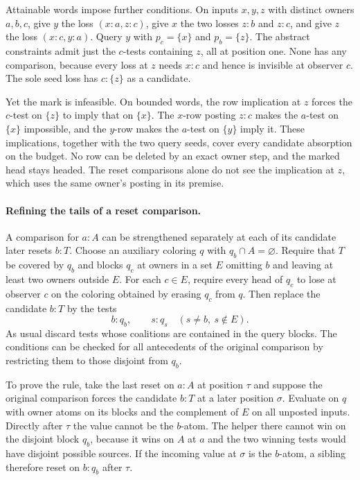 Attainable words impose further conditions.
On inputs $x,y,z$ with distinct owners $a,b,c$,
give $y$ the loss $(x{:}a,z{:}c)$, give $x$ the
two losses $z{:}b$ and $z{:}c$, and give $z$ the
loss $(x{:}c,y{:}a)$. Query $y$ with
$p_c=\{x\}$ and $p_b=\{z\}$. The abstract
constraints admit just the $c$-tests containing
$z$, all at position one. None has any
comparison, because every loss at $z$ needs
$x{:}c$ and hence is invisible at observer
$c$. The sole seed loss has $c:\{z\}$ as a
candidate.

Yet the mark is infeasible. On bounded words,
the row implication at $z$ forces the $c$-test
on $\{z\}$ to imply that on $\{x\}$. The
$x$-row posting $z{:}c$ makes the $a$-test
on $\{x\}$ impossible, and the $y$-row makes
the $a$-test on $\{y\}$ imply it. These
implications, together with the two query
seeds, cover every candidate absorption on
the budget. No row can be deleted by an
exact owner step, and the marked head stays
headed. The reset comparisons alone do not
see the implication at $z$, which uses the
same owner's posting in its premise.

\paragraph{Refining the tails of a reset comparison.}
A comparison for $a:A$ can be strengthened separately at
each of its candidate later resets $b:T$. Choose an
auxiliary coloring $q$ with $q_b\cap A=\varnothing$.
Require that $T$ be covered by $q_b$ and blocks $q_c$
at owners in a set $E$ omitting $b$ and leaving at least
two owners outside $E$. For each $c\in E$,
require every head of $q_c$ to lose at observer $c$
on the coloring obtained by erasing $q_c$ from $q$.
Then replace the candidate $b:T$ by the tests
\[
   b:q_b,\qquad
   s:q_s\quad(s\ne b,\ s\notin E).
\]
As usual discard tests whose coalitions are contained
in the query blocks. The conditions can be checked
for all antecedents of the original comparison by
restricting them to those disjoint from $q_b$.

To prove the rule, take the last reset on $a:A$ at
position $\tau$ and suppose the original comparison
forces the candidate $b:T$ at a later position $\sigma$.
Evaluate on $q$ with owner atoms on its blocks and
the complement of $E$ on all unposted inputs.
Directly after $\tau$ the value cannot be the $b$-atom.
The helper there cannot win on the disjoint block $q_b$, because
it wins on $A$ at $a$ and the two winning tests would
have disjoint possible sources. If the incoming value
at $\sigma$ is the $b$-atom, a sibling therefore reset
on $b:q_b$ after $\tau$.

